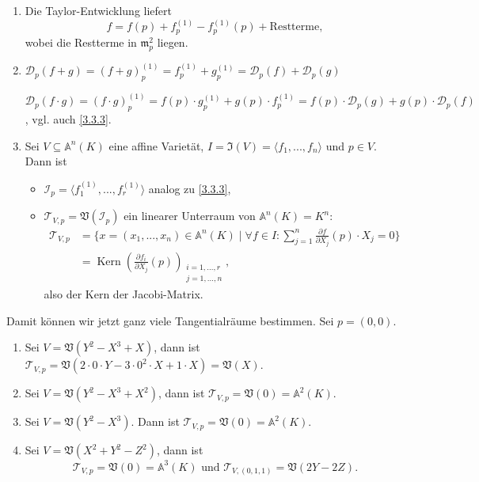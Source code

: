 \documentclass[a4paper,12pt,index=toc]{scrbook}
\theoremstyle{keinenummern} %
\def\A{\mathbb{A}}
\def\V{\mathfrak{V}}
\def\I{\mathfrak{I}}
\def\II{\mathcal{I}}
\newcommand{\DD}{\mathcal{D}} %
\def\T{\mathcal{T}}
\def\m{\mathfrak{m}}
\newcommand{\Kern}{\operatorname{Kern}}
\let\olddotsc\dotsc %
\renewcommand{\dotsc}{\ensuremath{\!...}}
\begin{document}
\begin{bem}\label{3.3.4}
\begin{enumerate}
\item{} Die Taylor-Entwicklung liefert
\begin{equation*}f=f(p)+f_{p}^{(1)}-f_{p}^{(1)}(p)+\text{Restterme},\end{equation*}
wobei die Restterme in $\m_{p}^{2}$ liegen.
\item{} $\DD_{p}(f+g)=(f+g)_{p}^{(1)}=f_{p}^{(1)}+g_{p}^{(1)}=\DD_{p}(f)+\DD_{p}(g)$

$\DD_{p}(f\cdot g)=(f\cdot g)_{p}^{(1)}=f(p)\cdot g_{p}^{(1)}+g(p)\cdot f_{p}^{(1)}=f(p)\cdot \DD_{p}(g)+g(p)\cdot\DD_{p}(f)$, vgl. auch \cref{3.3.3}.
\item{} Sei $V\subseteq\A^{n}(K)$ eine affine Varietät, $I=\I(V)=\langle f_{1},\dotsc,f_{n}\rangle$ und $p\in V$. Dann ist
\begin{itemize}
\item $\II_{p}=\langle f_{1}^{(1)},\dotsc,f_{r}^{(1)}\rangle$ analog zu \cref{3.3.3},
\item $\T_{V,p}=\V(\II_{p})$ ein linearer Unterraum von $\A^{n}(K)=K^{n}$:
\begin{align*}\T_{V,p}&=\{x=(x_{1},\dotsc,x_{n})\in\A^{n}(K)\mid \forall f\in I:\sum_{j=1}^{n}\frac{\partial f}{\partial X_{j}}(p)\cdot X_{j}=0\}\\
&=\Kern\left(\frac{\partial f_{i}}{\partial X_{j}}(p)\right)_{\substack{i=1,\olddotsc,r\\ j=1,\olddotsc,n}},\end{align*}
also der Kern der Jacobi-Matrix.
\end{itemize}
\end{enumerate}\end{bem}

\begin{bsp}\label{3.3.5}
Damit können wir jetzt ganz viele Tangentialräume bestimmen. Sei $p=(0,0)$.
\begin{enumerate}
\item Sei $V=\V(Y^{2}-X^{3}+X)$, dann ist $\T_{V,p}=\V(2\cdot 0\cdot Y - 3\cdot 0^{2}\cdot X + 1\cdot X)=\V(X)$.
\item Sei $V=\V(Y^{2}-X^{3}+X^{2})$, dann ist $\T_{V,p}=\V(0)=\A^{2}(K)$.
\item Sei $V=\V(Y^{2}-X^{3})$. Dann ist $\T_{V,p}=\V(0)=\A^{2}(K)$.
\item Sei $V=\V(X^{2}+Y^{2}-Z^{2})$, dann ist 
\begin{equation*}\T_{V,p}=\V(0)=\A^{3}(K)\text{ und }\T_{V,(0,1,1)}=\V(2Y-2Z).\end{equation*}
\end{enumerate}\end{bsp}
\end{document}
